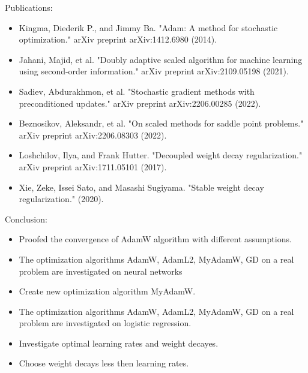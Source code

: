 \documentclass[aspectratio=169, 12pt]{beamer}
\begin{document}
\begin{frame}{Publications:}
    \begin{itemize}
        \item Kingma, Diederik P., and Jimmy Ba. "Adam: A method for stochastic optimization." arXiv preprint arXiv:1412.6980 (2014).
        \item Jahani, Majid, et al. "Doubly adaptive scaled algorithm for machine learning using second-order information." arXiv preprint arXiv:2109.05198 (2021).
        \item Sadiev, Abdurakhmon, et al. "Stochastic gradient methods with preconditioned updates." arXiv preprint arXiv:2206.00285 (2022).
        \item Beznosikov, Aleksandr, et al. "On scaled methods for saddle point problems." arXiv preprint arXiv:2206.08303 (2022).
        \item Loshchilov, Ilya, and Frank Hutter. "Decoupled weight decay regularization." arXiv preprint arXiv:1711.05101 (2017).
        \item Xie, Zeke, Issei Sato, and Masashi Sugiyama. "Stable weight decay regularization." (2020).
    \end{itemize}
\end{frame}

\begin{frame}{Conclusion:}
    \begin{itemize}
        \item Proofed the convergence of AdamW algorithm with different assumptions.
        \item The optimization algorithms AdamW, AdamL2, MyAdamW, GD on a real problem are investigated on neural networks
        \item Create new optimization algorithm MyAdamW.
        \item The optimization algorithms AdamW, AdamL2, MyAdamW, GD on a real problem are investigated on logistic regression.
        \item Investigate optimal learning rates and weight decayes.
        \item Choose weight decays less then learning rates.
    \end{itemize}
\end{frame}
\end{document}
